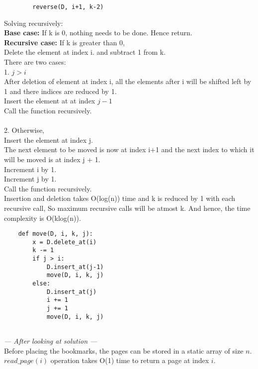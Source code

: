 \documentclass[12pt,twoside]{article}
\begin{document}
\begin{problems}
\begin{problemparts}
\begin{lstlisting}
        reverse(D, i+1, k-2)
\end{lstlisting}

\newpage
\problempart %
Solving recursively: \\
\textbf{Base case:} If k is 0, nothing needs to be done. Hence return. \\
\textbf{Recursive case:} If k is greater than 0, \\
Delete the element at index i. and subtract 1 from k. \\

There are two cases: \\
1. $j > i$ \\
After deletion of element at index i, all the elements after i will be shifted left by 1 and there indices are reduced by 1. \\
Insert the element at at index $j-1$ \\
Call the function recursively. \\ \\
2. Otherwise, \\
Insert the element at index j. \\
The next element to be moved is now at index i+1 and the next index to which it will be moved is at index j + 1. \\
Increment i by 1. \\
Increment j by 1. \\
Call the function recursively. \\

Insertion and deletion takes O(log(n)) time and k is reduced by 1 with each recursive call, So maximum recursive calls will be atmost k. And hence, the time complexity is O(klog(n)). \\
\begin{lstlisting}
    def move(D, i, k, j):
        x = D.delete_at(i)
        k -= 1
        if j > i:
            D.insert_at(j-1)
            move(D, i, k, j)
        else:
            D.insert_at(j)
            i += 1
            j += 1
            move(D, i, k, j)
        
\end{lstlisting}
\end{problemparts}

\newpage
\problem  %
\textit{--- After looking at solution ---} \\
Before placing the bookmarks, the pages can be stored in a static array of size $n$. \\
$read\_page(i)$ operation takes O(1) time to return a page at index $i$. \\


\end{problems}
\end{document}
